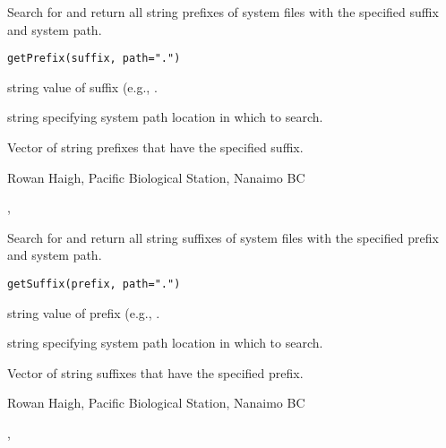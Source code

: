\documentclass[letterpaper]{book}
\begin{document}
\begin{Description}\relax
Search for and return all string prefixes of system files 
with the specified suffix and system path.
\end{Description}
\begin{Usage}
\begin{verbatim}
getPrefix(suffix, path=".")
\end{verbatim}
\end{Usage}
\begin{Arguments}
\begin{ldescription}
\item[\code{suffix}] string value of suffix (e.g., . 
\item[\code{path}] string specifying system path location in which to search. 
\end{ldescription}
\end{Arguments}
\begin{Value}
Vector of string prefixes that have the specified suffix.
\end{Value}
\begin{Author}\relax
Rowan Haigh, Pacific Biological Station, Nanaimo BC
\end{Author}
\begin{SeeAlso}\relax
{}, 
\end{SeeAlso}

\begin{Description}\relax
Search for and return all string suffixes of system files 
with the specified prefix and system path.
\end{Description}
\begin{Usage}
\begin{verbatim}
getSuffix(prefix, path=".")
\end{verbatim}
\end{Usage}
\begin{Arguments}
\begin{ldescription}
\item[\code{prefix}] string value of prefix (e.g., . 
\item[\code{path}] string specifying system path location in which to search. 
\end{ldescription}
\end{Arguments}
\begin{Value}
Vector of string suffixes that have the specified prefix.
\end{Value}
\begin{Author}\relax
Rowan Haigh, Pacific Biological Station, Nanaimo BC
\end{Author}
\begin{SeeAlso}\relax
{}, 
\end{SeeAlso}
\end{document}
